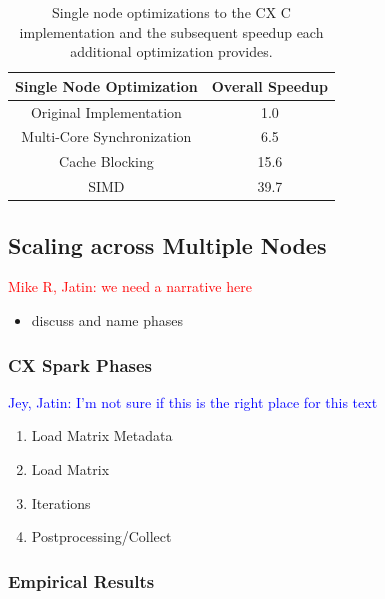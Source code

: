  
  \begin{table}
  \begin{center}
  \begin{tabular}{ |c|c| } 
  \hline
  Single Node Optimization & Overall Speedup\\
  \hline
  Original Implementation & 1.0  \\
  Multi-Core Synchronization & 6.5 \\
  Cache Blocking & 15.6 \\
  SIMD & 39.7 \\
  \hline

  \end{tabular}
  \end{center}
  \caption{Single node optimizations to the CX C implementation and
  the subsequent speedup  each additional optimization provides.}
  \label{tab:single_node}
  \end{table}
 



  \subsection{Scaling across Multiple Nodes}
  \textcolor{red}{Mike R, Jatin: we need a narrative here}
    \begin{itemize}
      \item discuss and name phases
    \end{itemize}

  \subsubsection{CX Spark Phases}
    \textcolor{blue}{Jey, Jatin: I'm not sure if this is the right place for this text}
    \begin{enumerate}
        \item Load Matrix Metadata
        \item Load Matrix
        \item Iterations
        \item Postprocessing/Collect
    \end{enumerate}

  \subsubsection{Empirical Results}


